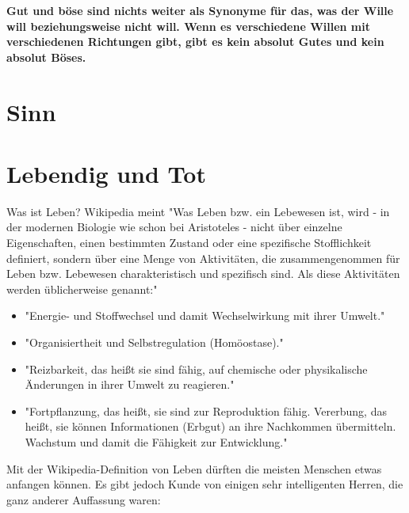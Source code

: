\documentclass[12pt]{book}
\begin{document}
\textbf{Gut und böse sind nichts weiter als Synonyme für das, was der Wille will beziehungsweise nicht will. Wenn es verschiedene Willen mit verschiedenen Richtungen gibt, gibt es kein absolut Gutes und kein absolut Böses.}

\section{Sinn}

\section{Lebendig und Tot}

Was ist Leben? Wikipedia meint
"Was Leben bzw. ein Lebewesen ist, wird - in der modernen Biologie wie schon bei Aristoteles - nicht über einzelne Eigenschaften, einen bestimmten Zustand oder eine spezifische Stofflichkeit definiert, sondern über eine Menge von Aktivitäten, die zusammengenommen für Leben bzw. Lebewesen charakteristisch und spezifisch sind. Als diese Aktivitäten werden üblicherweise genannt:"
\begin{itemize}
\item "Energie- und Stoffwechsel und damit Wechselwirkung mit ihrer Umwelt."
\item "Organisiertheit und Selbstregulation (Homöostase)."
\item "Reizbarkeit, das heißt sie sind fähig, auf chemische oder physikalische Änderungen in ihrer Umwelt zu reagieren."
\item "Fortpflanzung, das heißt, sie sind zur Reproduktion fähig.
Vererbung, das heißt, sie können Informationen (Erbgut) an ihre Nachkommen übermitteln.
Wachstum und damit die Fähigkeit zur Entwicklung."
\end{itemize}

Mit der Wikipedia-Definition von Leben dürften die meisten Menschen etwas anfangen können. Es gibt jedoch Kunde von einigen sehr intelligenten Herren, die ganz anderer Auffassung waren:
\end{document}
